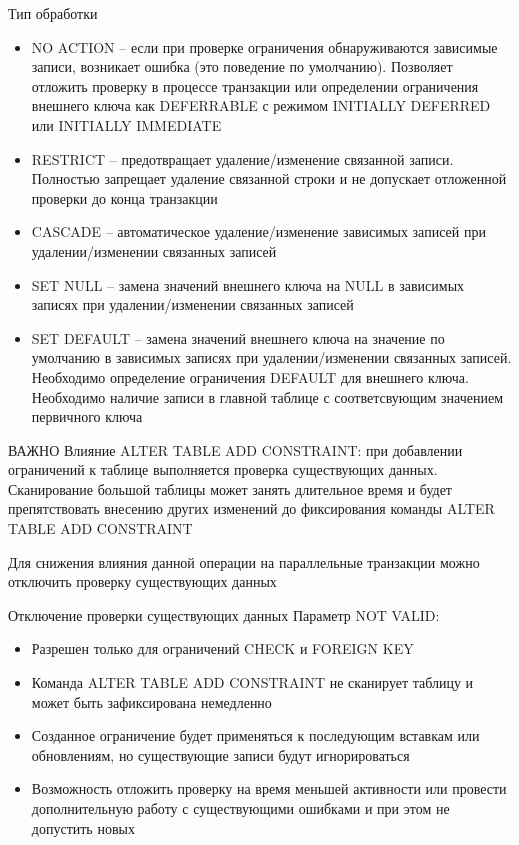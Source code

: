 \documentclass[12pt]{article}
\begin{document}
\begin{nota}{Тип обработки}
    \begin{itemize}
        \item NO ACTION -- если при проверке ограничения обнаруживаются зависимые записи, возникает ошибка (это поведение по умолчанию). Позволяет отложить проверку в процессе транзакции или определении ограничения внешнего ключа как DEFERRABLE с режимом INITIALLY DEFERRED или INITIALLY IMMEDIATE
        \item RESTRICT -- предотвращает удаление/изменение связанной записи. Полностью запрещает удаление связанной строки и не допускает отложенной проверки до конца транзакции 
        \item CASCADE -- автоматическое удаление/изменение зависимых записей при удалении/изменении связанных записей
        \item SET NULL -- замена значений внешнего ключа на NULL в зависимых записях при удалении/изменении связанных записей
        \item SET DEFAULT -- замена значений внешнего ключа на значение по умолчанию в зависимых записях при удалении/изменении связанных записей. Необходимо определение ограничения DEFAULT для внешнего ключа. Необходимо наличие записи в главной таблице с соответсвующим значением первичного ключа 
    \end{itemize}
\end{nota}

\begin{Remark}{ВАЖНО}
    Влияние ALTER TABLE ADD CONSTRAINT: при добавлении ограничений к таблице выполняется проверка существующих данных. Сканирование большой таблицы может занять длительное время и будет препятствовать внесению других изменений до фиксирования команды ALTER TABLE ADD CONSTRAINT

    Для снижения влияния данной операции на параллельные транзакции можно отключить проверку существующих данных 
\end{Remark}

\begin{nota}{Отключение проверки существующих данных}
    Параметр NOT VALID: 

    \begin{itemize}
        \item Разрешен только для ограничений CHECK и FOREIGN KEY 
        \item Команда ALTER TABLE ADD CONSTRAINT не сканирует таблицу и может быть зафиксирована немедленно 
        \item Созданное ограничение будет применяться к последующим вставкам или обновлениям, но существующие записи будут игнорироваться 
        \item Возможность отложить проверку на время меньшей активности или провести дополнительную работу с существующими ошибками и при этом не допустить новых 
    \end{itemize}
\end{nota}
\end{document}
